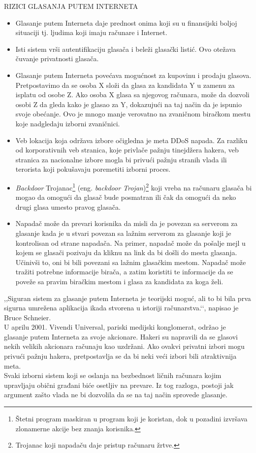 \documentclass[a4paper]{article}
\theoremstyle{break}
\begin{document}
{\noindent RIZICI GLASANJA PUTEM INTERNETA
\begin{itemize}
\item Glasanje putem Interneta daje prednost onima koji su u finansijski boljoj situaciji tj. ljudima koji imaju računare i Internet.
\item Isti sistem vrši autentifikaciju glasača i beleži glasački listić. Ovo otežava čuvanje privatnosti glasača.
\item Glasanje putem Interneta povećava mogućnost za kupovinu i prodaju glasova. Pretpostavimo da se osoba X složi da glasa za kandidata Y u zamenu za isplatu od osobe Z. Ako osoba X glasa sa njegovog računara, može da dozvoli osobi Z da gleda kako je glasao za Y, dokazujući na taj način da je ispunio svoje obećanje. Ovo je mnogo manje verovatno na zvaničnom biračkom mestu koje nadgledaju izborni zvaničnici.
\item Veb lokacija koja održava izbore očigledna je meta DDoS napada. Za razliku od korporativnih veb stranica, koje privlače pažnju tinejdžera hakera, veb stranica za nacionalne izbore mogla bi privući pažnju stranih vlada ili terorista koji pokušavaju poremetiti izborni proces.
\item \textit{Backdoor} Trojanac\footnote{Štetni program maskiran u program koji je koristan, dok u pozadini izvršava zlonamerne akcije bez znanja korisnika.} (eng. {\em backdoor Trojan})\footnote{Trojanac koji napadaču daje pristup računaru žrtve.} koji vreba na računaru glasača bi mogao da omogući da glasač bude posmatran ili čak da omogući da neko drugi glasa umesto pravog glasača.
\item Napadač može da prevari korisnika da misli da je povezan sa serverom za glasanje kada je u stvari povezan sa lažnim serverom za glasanje koji je kontrolisan od strane napadača. Na primer, napadač može da pošalje mejl u kojem se glasači pozivaju da kliknu na link da bi došli do mesta glasanja. Učinivši to, oni bi bili povezani sa lažnim glasačkim mestom. Napadač može tražiti potrebne informacije birača, a zatim koristiti te informacije da se poveže sa pravim biračkim mestom i glasa za kandidata za koga želi.
\end{itemize}

,,Siguran sistem za glasanje putem Interneta je teorijski moguć, ali to bi bila prva sigurna umrežena aplikacija ikada stvorena u istoriji računarstva.‘‘, napisao je Bruce Schneier\cite{online_voting}.\\
\indent U aprilu 2001. Vivendi Universal, pariski medijski konglomerat, održao je glasanje putem Interneta za svoje akcionare. Hakeri su napravili da se glasovi nekih velikih akcionara računaju kao uzdržani. Ako ovakvi privatni izbori mogu privući pažnju hakera, pretpostavlja se da bi neki veći izbori bili atraktivnija meta.\\
\indent Svaki izborni sistem koji se oslanja na bezbednost ličnih računara kojim upravljaju obični građani biće osetljiv na prevare. Iz tog razloga, postoji jak argument zašto vlada ne bi dozvolila da se na taj način sprovede glasanje.

}
\end{document}

